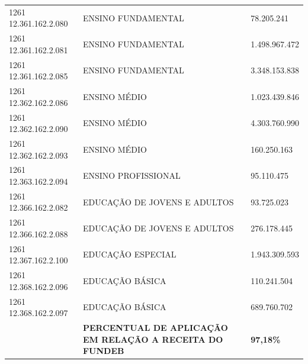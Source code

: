 \documentclass{article}
\begin{document}
\begin{longtable}[c]{m{3cm}|m{12cm}|m{3cm}}
\multicolumn{1}{L{3cm}|}{1261 12.361.162.2.080} & \multicolumn{1}{L{12cm}|}{ENSINO FUNDAMENTAL} & \multicolumn{1}{R{3cm}}{78.205.241} \\
\multicolumn{1}{L{3cm}|}{1261 12.361.162.2.081} & \multicolumn{1}{L{12cm}|}{ENSINO FUNDAMENTAL} & \multicolumn{1}{R{3cm}}{1.498.967.472} \\
\multicolumn{1}{L{3cm}|}{1261 12.361.162.2.085} & \multicolumn{1}{L{12cm}|}{ENSINO FUNDAMENTAL} & \multicolumn{1}{R{3cm}}{3.348.153.838} \\
\multicolumn{1}{L{3cm}|}{1261 12.362.162.2.086} & \multicolumn{1}{L{12cm}|}{ENSINO MÉDIO} & \multicolumn{1}{R{3cm}}{1.023.439.846} \\
\multicolumn{1}{L{3cm}|}{1261 12.362.162.2.090} & \multicolumn{1}{L{12cm}|}{ENSINO MÉDIO} & \multicolumn{1}{R{3cm}}{4.303.760.990} \\
\multicolumn{1}{L{3cm}|}{1261 12.362.162.2.093} & \multicolumn{1}{L{12cm}|}{ENSINO MÉDIO} & \multicolumn{1}{R{3cm}}{160.250.163} \\
\multicolumn{1}{L{3cm}|}{1261 12.363.162.2.094} & \multicolumn{1}{L{12cm}|}{ENSINO PROFISSIONAL} & \multicolumn{1}{R{3cm}}{95.110.475} \\
\multicolumn{1}{L{3cm}|}{1261 12.366.162.2.082} & \multicolumn{1}{L{12cm}|}{EDUCAÇÃO DE JOVENS E ADULTOS} & \multicolumn{1}{R{3cm}}{93.725.023} \\
\multicolumn{1}{L{3cm}|}{1261 12.366.162.2.088} & \multicolumn{1}{L{12cm}|}{EDUCAÇÃO DE JOVENS E ADULTOS} & \multicolumn{1}{R{3cm}}{276.178.445} \\
\multicolumn{1}{L{3cm}|}{1261 12.367.162.2.100} & \multicolumn{1}{L{12cm}|}{EDUCAÇÃO ESPECIAL} & \multicolumn{1}{R{3cm}}{1.943.309.593} \\
\multicolumn{1}{L{3cm}|}{1261 12.368.162.2.096} & \multicolumn{1}{L{12cm}|}{EDUCAÇÃO BÁSICA} & \multicolumn{1}{R{3cm}}{110.241.504} \\
\multicolumn{1}{L{3cm}|}{1261 12.368.162.2.097} & \multicolumn{1}{L{12cm}|}{EDUCAÇÃO BÁSICA} & \multicolumn{1}{R{3cm}}{689.760.702} \\
\hline\hline
\multicolumn{1}{L{3cm}|}{ \textbf{}} & \multicolumn{1}{L{12cm}|}{ \textbf{PERCENTUAL DE APLICAÇÃO EM RELAÇÃO A RECEITA DO FUNDEB}} & \multicolumn{1}{R{3cm}}{ \textbf{97,18\%}} \\\hline\hline\hline\end{longtable}\vspace{-0.4cm} \raggedright\fontsize{7pt}{10pt}\selectfont {Fonte: PPO.} \\\fontsize{7pt}{10pt}\selectfont {ELABORAÇÃO: DCAF/SCPPO/SEPLAG}\\
\end{document}
